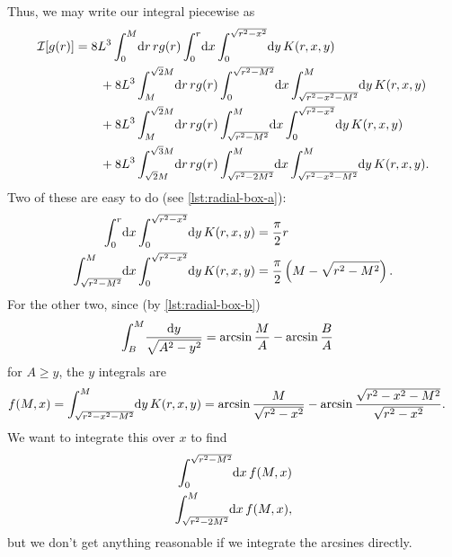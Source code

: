 Thus, we may write our integral piecewise as
\begin{align}
	\mathcal{I}[g(r)]
	&= 8 L^3 \int_0^M\! \dif r \, r g(r) \int_0^r\! \dif x
			\int_0^{\sqrt{r^2 - x^2}}\! \dif y \, K(r, x, y) \notag \\
	&\qquad
		+ 8 L^3 \int_M^{\sqrt{2} M}\! \dif r \, r g(r)
			\int_0^{\sqrt{r^2 - M^2}}\! \dif x
				\int_{\sqrt{r^2 - x^2 - M^2}}^M\! \dif y \, K(r, x, y) \notag \\
	&\qquad
		+ 8 L^3 \int_M^{\sqrt{2} M}\! \dif r \, r g(r)
			\int_{\sqrt{r^2 - M^2}}^M\! \dif x
				\int_0^{\sqrt{r^2 - x^2}}\! \dif y \, K(r, x, y) \notag \\
	&\qquad
		+ 8 L^3 \int_{\sqrt{2} M}^{\sqrt{3} M}\! \dif r \, r g(r) \int_{\sqrt{r^2 - 2 M^2}}^M\! \dif x
				\int_{\sqrt{r^2 - x^2 - M^2}}^M\! \dif y \, K(r, x, y).
\end{align}
Two of these are easy to do (see \vref{lst:radial-box-a}):
\begin{subequations} \label{eq:radial-box-a}
\begin{align}
	\int_0^r\! \dif x \int_0^{\sqrt{r^2 - x^2}}\! \dif y \, K(r, x, y)
	&= \frac{\pi}{2} r \\
	\int_{\sqrt{r^2 - M^2}}^M\! \dif x \int_0^{\sqrt{r^2 - x^2}}\! \dif y \, K(r, x, y)
	&= \frac{\pi}{2} \left( M - \sqrt{r^2 - M^2} \right).
\end{align}
\end{subequations}
For the other two, since (by \vref{lst:radial-box-b})
\begin{align}
	\int_B^M\! \frac{\dif y}{\sqrt{A^2 - y^2}}
	&= \arcsin{\frac{M}{A}} - \arcsin{\frac{B}{A}}
		\label{eq:radial-box-b}
\end{align}
for $A \ge y$, the $y$ integrals are
\begin{align}
	f(M, x)
	&= \int_{\sqrt{r^2 - x^2 - M^2}}^M\! \dif y \, K(r, x, y)
	= \arcsin{\frac{M}{\sqrt{r^2 - x^2}}} - \arcsin{\frac{\sqrt{r^2 - x^2 - M^2}}{\sqrt{r^2 - x^2}}}.
\end{align}
We want to integrate this over $x$ to find
\begin{subequations}
\begin{align}
	\int_0^{\sqrt{r^2 - M^2}}\! \dif x \, f(M, x)
		\label{eq:radial-box-bad-integral-a} \\
	\int_{\sqrt{r^2 - 2 M^2}}^M\! \dif x \, f(M, x),
		\label{eq:radial-box-bad-integral-b}
\end{align}
\end{subequations}
but we don't get anything reasonable if we integrate the arcsines directly.

